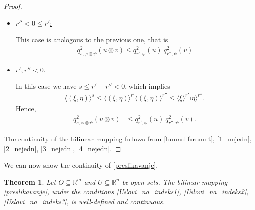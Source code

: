 \documentclass{amsart}
\newtheorem{theorem}{Theorem}[section]
\theoremstyle{definition}
\begin{document}
\begin{proof}
\begin{itemize}
\item \underline{$r''<0 \leq r'$:}

This case is analogous to the previous one, that is
\begin{align}
\label{3_nejedn}
q_{s; \varphi \otimes \psi} ^2 (u\otimes v)
\leq q_{r'; \varphi } ^2 (u) \ q_{r''; \psi} ^2 (v)
\end{align}

\item \underline{$r',r''<0 $:}

In this case we have $s\leq r'+r''<0$, which implies
\begin{align*}
\langle (\xi , \eta) \rangle^{s}
\leq \langle (\xi , \eta) \rangle^{r'} \langle (\xi , \eta) \rangle^{r''}
\leq \langle \xi \rangle^{r'} \langle \eta \rangle^{r''}.
\end{align*}
Hence,
\begin{align}
\label{4_nejedn}
q_{s; \varphi \otimes \psi} ^2 (u\otimes v)
&\leq q_{r'; \varphi } ^2 (u) \ q_{r''; \psi} ^2 (v).
\end{align}
\end{itemize}
The continuity of the bilinear mapping follows from \eqref{bound-forone-t}, \eqref{1_nejedn}, \eqref{2_nejedn}, \eqref{3_nejedn}, \eqref{4_nejedn}.
\end{proof}

We can now show the continuity of \eqref{preslikavanje}.

\begin{theorem}
\label{hipo_tenz_proizv}
    Let $O\subseteq \mathbb{R}^m$ and $U\subseteq \mathbb{R}^n$ be open sets. The bilinear mapping \eqref{preslikavanje}, under the conditions \eqref{Uslovi_na_indeks1}, \eqref{Uslovi_na_indeks2}, \eqref{Uslovi_na_indeks3}, is well-defined and continuous.
\end{theorem}
\end{document}
